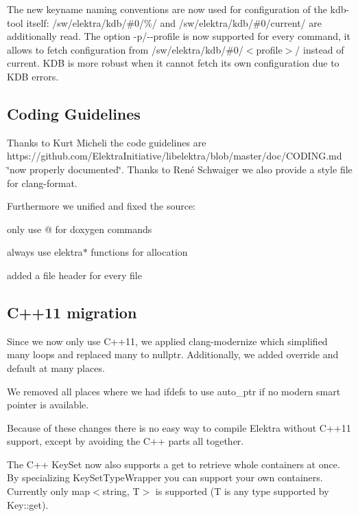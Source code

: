 The new keyname naming conventions are now used for configuration of the {\ttfamily kdb}-\/tool itself\+: {\ttfamily /sw/elektra/kdb/\#0/\%/} and {\ttfamily /sw/elektra/kdb/\#0/current/} are additionally read. The option {\ttfamily -\/p}/{\ttfamily -\/-\/profile} is now supported for every command, it allows to fetch configuration from {\ttfamily /sw/elektra/kdb/\#0/$<$profile$>$/} instead of {\ttfamily current}. K\+D\+B is more robust when it cannot fetch its own configuration due to K\+D\+B errors.

\subsection*{Coding Guidelines}

Thanks to Kurt Micheli the code guidelines are https\+://github.com/\+Elektra\+Initiative/libelektra/blob/master/doc/\+C\+O\+D\+I\+N\+G.\+md \char`\"{}now properly documented\char`\"{}. Thanks to René Schwaiger we also provide a style file for clang-\/format.

Furthermore we unified and fixed the source\+:
\begin{DoxyItemize}
\item only use @ for doxygen commands
\item always use elektra$\ast$ functions for allocation
\item added a file header for every file
\end{DoxyItemize}

\subsection*{C++11 migration}

Since we now only use C++11, we applied {\ttfamily clang-\/modernize} which simplified many loops and replaced many {} to {\ttfamily nullptr}. Additionally, we added {\ttfamily override} and {\ttfamily default} at many places.

We removed all places where we had {\ttfamily ifdefs} to use {\ttfamily auto\+\_\+ptr} if no modern smart pointer is available.

Because of these changes there is no easy way to compile Elektra without C++11 support, except by avoiding the C++ parts all together.

The C++ {\ttfamily Key\+Set} now also supports a {\ttfamily get} to retrieve whole containers at once. By specializing {\ttfamily Key\+Set\+Type\+Wrapper} you can support your own containers. Currently only {\ttfamily map$<$string, T$>$} is supported (T is any type supported by {\ttfamily Key\+::get}).

